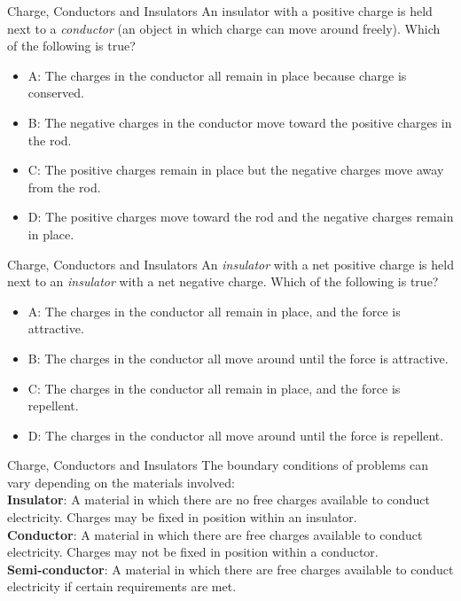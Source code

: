 \documentclass{beamer}
\begin{document}
\begin{frame}{Charge, Conductors and Insulators}
An insulator with a positive charge is held next to a \textit{conductor} (an object in which charge can move around freely).  Which of the following is true?
\begin{itemize}
\item A: The charges in the conductor all remain in place because charge is conserved.
\item B: The negative charges in the conductor move toward the positive charges in the rod.
\item C: The positive charges remain in place but the negative charges move away from the rod.
\item D: The positive charges move toward the rod and the negative charges remain in place.
\end{itemize}
\end{frame}

\begin{frame}{Charge, Conductors and Insulators}
An \textit{insulator} with a net positive charge is held next to an \textit{insulator} with a net negative charge.  Which of the following is true?
\begin{itemize}
\item A: The charges in the conductor all remain in place, and the force is attractive.
\item B: The charges in the conductor all move around until the force is attractive.
\item C: The charges in the conductor all remain in place, and the force is repellent.
\item D: The charges in the conductor all move around until the force is repellent.
\end{itemize}
\end{frame}

\begin{frame}{Charge, Conductors and Insulators}
The boundary conditions of problems can vary depending on the materials involved: \\ \vspace{0.5cm}
\textbf{Insulator}: A material in which there are no free charges available to conduct electricity.  Charges may be fixed in position within an insulator. \\
\textbf{Conductor}: A material in which there are free charges available to conduct electricity.  Charges may not be fixed in position within a conductor. \\
\textbf{Semi-conductor}: A material in which there are free charges available to conduct electricity if certain requirements are met.
\end{frame}
\end{document}
